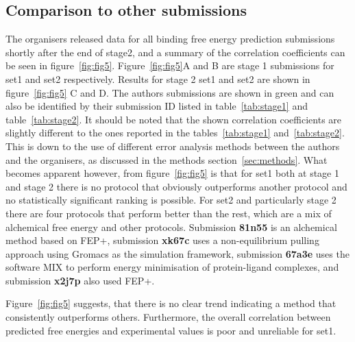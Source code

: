 \documentclass{svjour3}                     %
\begin{document}
\subsection{Comparison to other submissions}
The organisers released data for all binding free energy prediction submissions shortly after the end of stage2, and a summary of the correlation coefficients can be seen in figure~\ref{fig:fig5}. Figure~\ref{fig:fig5}A and B are stage 1 submissions for set1 and set2 respectively. Results for stage 2 set1 and set2 are shown in figure~\ref{fig:fig5} C and D. The authors submissions are shown in green and can also be identified by their submission ID listed in table~\ref{tab:stage1} and table~\ref{tab:stage2}. It should be noted that the shown correlation coefficients are slightly different to the ones reported in the tables~\ref{tab:stage1} and~\ref{tab:stage2}. This is down to the use of different error analysis methods between the authors and the organisers, as discussed in the methods section~\ref{sec:methods}. 
What becomes apparent however, from figure~\ref{fig:fig5} is that for set1 both at stage 1 and stage 2 there is no protocol that obviously outperforms another protocol and no statistically significant ranking is possible. 
For set2 and particularly stage 2 there are four protocols that perform better than the rest, which are a mix of alchemical free energy and other protocols. Submission \textbf{81n55} is an alchemical method based on FEP+, submission \textbf{xk67c} uses a non-equilibrium pulling approach using Gromacs as the simulation framework, submission \textbf{67a3e} uses the software MIX to perform energy minimisation of protein-ligand complexes, and submission \textbf{x2j7p} also used FEP+. 

Figure~\ref{fig:fig5} suggests, that there is no clear trend indicating a method that consistently outperforms others. Furthermore, the overall correlation between predicted free energies and experimental values is poor and unreliable for set1. 
 
\end{document}
